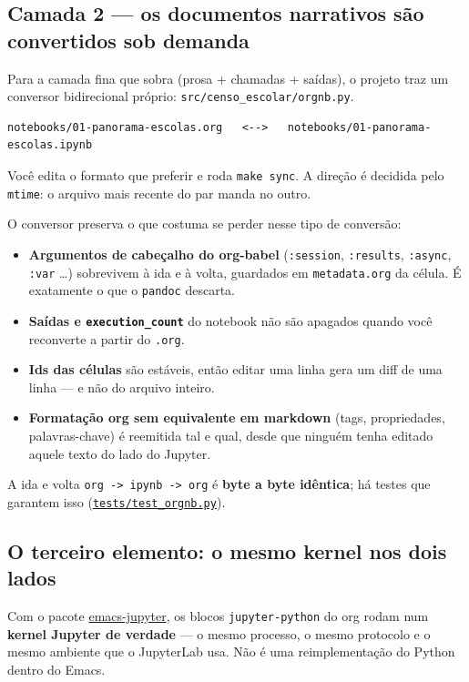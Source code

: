\documentclass[11pt]{article}
\begin{document}
\subsection*{Camada 2 — os documentos narrativos são convertidos sob demanda}
\label{sec:orgc36f28a}

Para a camada fina que sobra (prosa + chamadas + saídas), o projeto traz um
conversor bidirecional próprio: \texttt{src/censo\_escolar/orgnb.py}.

\begin{verbatim}
notebooks/01-panorama-escolas.org   <-->   notebooks/01-panorama-escolas.ipynb
\end{verbatim}


Você edita o formato que preferir e roda \texttt{make sync}. A direção é decidida pelo
\texttt{mtime}: o arquivo mais recente do par manda no outro.

O conversor preserva o que costuma se perder nesse tipo de conversão:

\begin{itemize}
\item \textbf{Argumentos de cabeçalho do org-babel} (\texttt{:session}, \texttt{:results}, \texttt{:async},
\texttt{:var} …) sobrevivem à ida e à volta, guardados em \texttt{metadata.org} da célula.
É exatamente o que o \texttt{pandoc} descarta.

\item \textbf{Saídas e \texttt{execution\_count}} do notebook não são apagados quando você
reconverte a partir do \texttt{.org}.

\item \textbf{Ids das células} são estáveis, então editar uma linha gera um diff de uma
linha — e não do arquivo inteiro.

\item \textbf{Formatação org sem equivalente em markdown} (tags, propriedades,
palavras-chave) é reemitida tal e qual, desde que ninguém tenha editado
aquele texto do lado do Jupyter.
\end{itemize}

A ida e volta \texttt{org -> ipynb -> org} é \textbf{byte a byte idêntica}; há testes que
garantem isso (\href{tests/test\_orgnb.py}{\texttt{tests/test\_orgnb.py}}).
\subsection*{O terceiro elemento: o mesmo kernel nos dois lados}
\label{sec:orgd6027d5}

Com o pacote \href{https://github.com/emacs-jupyter/jupyter}{emacs-jupyter}, os blocos \texttt{jupyter-python} do org rodam num \textbf{kernel
Jupyter de verdade} — o mesmo processo, o mesmo protocolo e o mesmo ambiente
que o JupyterLab usa. Não é uma reimplementação do Python dentro do Emacs.
\end{document}

